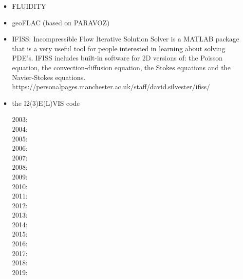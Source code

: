 \begin{itemize}
\item FLUIDITY
\cite{dawk11}
\cite{gagd14}

\item geoFLAC (based on PARAVOZ)
\cite{jala19}

\item IFISS: Incompressible Flow Iterative Solution Solver is a
MATLAB package that is a very useful tool for people interested in
learning about solving PDE’s.
IFISS includes built-in software for 2D versions of:
the Poisson equation, the convection-diffusion equation, the Stokes equations
and the Navier-Stokes equations.\\
\url{https://personalpages.manchester.ac.uk/staff/david.silvester/ifiss/}



\item the I2(3)E(L)VIS code

2003: \cite{geyu03}\cite{geyu03b}\cite{geur03}\\
2004: \cite{geym04}\cite{geys04}\cite{gepm04}\cite{geur04}\\
2005: \cite{buge05}\cite{mage05}\cite{stge05}\\
2006: \cite{bbeg06}\cite{gest06}\cite{gogc06}\cite{gecy06}\\
2007: \cite{geyu07}\cite{gogc07}\cite{gebu07}\cite{gogg07}\cite{gowg07}\\
2008: \cite{scbe08}\cite{gecy08}\cite{uegs08}\cite{fagc08}\cite{zhgy09}\cite{buge08}\cite{cage08}\cite{migb08}\cite{nigc08}\cite{gepb08}\\
2009: \cite{gefc09}\cite{bubg09}\cite{ligt09}\cite{famg09}\cite{lige09}\\
2010: \cite{gerya2010}\cite{nigm10}\cite{bagc10}\cite{ligb10}\\
2011: \cite{dugm11}\cite{dumg11}\cite{lixg11}\cite{gery11}\cite{geme11}\cite{blgg11}\cite{nigm11}\cite{gokg11}\\
2012: \cite{crsg12}\cite{dugk12}\cite{lixg12}\cite{fagm12}\cite{gohg12}\cite{uegb12}\\
2013: \cite{lixg13}\cite{nabg13}\cite{magc13}\cite{vagd13a}\cite{vagd13b}\cite{zhgt13}\cite{dyge13}\cite{gemd13}
      \cite{mana13}\cite{chgz13}\cite{chgz13b}\cite{duge13}\cite{cavg13}\cite{ligw13}\cite{vocg13}
      \cite{gery13c}\cite{gery13}\\
2014: \cite{dugs14}\cite{puge14}\cite{rugb14}\cite{voge14b}\cite{bagb14}\cite{lige14}\cite{stjm14}\cite{malg14}
\cite{buge14}\cite{gosk14}\cite{vamd14}\cite{macg14}\cite{basc14}\cite{gobg14}\cite{gery14b}\cite{gita14}\\
2015: \cite{duay15}\cite{uewg15}\cite{rula15}\cite{gesb15}\cite{rula15}\cite{kocb15}\\
2016: \cite{kobc16}\cite{magc16}\cite{fige16}\cite{mauw16}\\
2017: \cite{mauw17}\\
2018: \cite{zhlg18}\\
2019: \cite{kobg19}\cite{ligc19}


\end{itemize}
